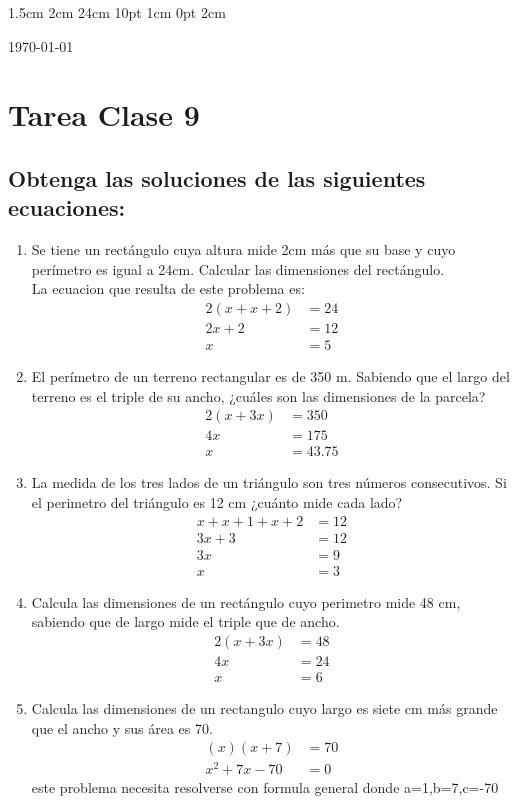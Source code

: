 \documentclass[12pt,letterpaper]{report}
\begin{document}
\setmargins{2.5cm}      
{1.5cm}                     
{2cm}  
{24cm}                    
{10pt}                          
{1cm}                          
{0pt}                             
{2cm}
\begin{flushright}
\today
\end{flushright}
\vspace{-1.75cm}
\section*{Tarea Clase 9}
\subsection*{Obtenga las soluciones de las siguientes ecuaciones:}
\begin{enumerate}
\item Se tiene un rectángulo cuya altura mide 2cm más que su base y cuyo perímetro es igual a 24cm. Calcular las dimensiones del rectángulo.\\
La ecuacion que resulta de este problema es:
\begin{align*}
    2(x+x+2)&=24\\
    2x+2&=12\\
    x&=5
\end{align*}
\item El perímetro de un terreno rectangular es de 350 m. Sabiendo que el largo del terreno es el triple de su ancho, ¿cuáles son las dimensiones de la parcela?
\begin{align*}
    2(x+3x)&=350\\
    4x&=175\\
    x&=43.75
\end{align*}
\item La medida de los tres lados de un triángulo son tres números consecutivos. Si el perimetro del triángulo es 12 cm ¿cuánto mide cada lado?
\begin{align*}
    x+x+1+x+2&=12\\
    3x+3&=12\\
    3x&=9\\
    x&=3
\end{align*}
\item Calcula las dimensiones de un rectángulo cuyo perimetro mide 48 cm, sabiendo que de largo mide el triple que de ancho.\\
\begin{align*}
    2(x+3x)&=48\\
    4x&=24\\
    x&=6
\end{align*}
\item Calcula las dimensiones de un rectangulo cuyo largo es siete cm más grande que el ancho y sus área es 70.
\begin{align*}
    (x)(x+7)&=70\\
    x^2+7x-70&=0
\end{align*}
este problema necesita resolverse con formula general donde a=1,b=7,c=-70
\end{enumerate}
\end{document}
